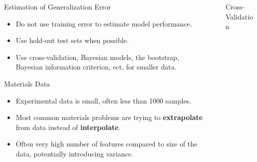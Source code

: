 \documentclass[final]{beamer}
\newlength{\sepwid}
\newlength{\onecolwid}
\begin{document}
\begin{frame}[t]
\begin{columns}[t]
\begin{column}{\onecolwid}
\begin{block}{Estimation of Generalization Error}
\begin{itemize}
    \item Do not use training error to estimate model performance.
    \item Use hold-out test sets when possible.
    \item Use cross-validation, Bayesian models, the bootstrap, Bayesian information criterion, ect, for smaller data.
\end{itemize}


\end{block}

\vspace{-1.0em}
\begin{block}{Materials Data}
\begin{itemize}
    \item Experimental data is small, often less than 1000 samples. 
    \item Most common materials problems are trying to \textbf{extrapolate} from data instead of \textbf{interpolate}.
    \item Often very high number of features compared to size of the data,  potentially introducing variance. 
\end{itemize}
\end{block}


\end{column} %

\begin{column}{\sepwid}\end{column} %

\begin{column}{\onecolwid} %


\begin{block}{Cross-Validation}


\end{block}
\end{column}
\end{columns}
\end{frame}
\end{document}
